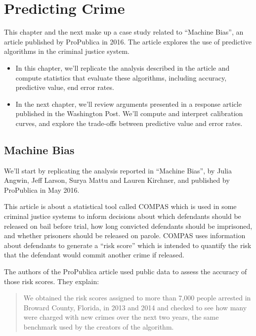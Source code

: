 \chapter{Predicting Crime}\label{predicting-crime}

This chapter and the next make up a case study related to ``Machine
Bias'', an article published by ProPublica in 2016. The article explores
the use of predictive algorithms in the criminal justice system.

\begin{itemize}
\item
  In this chapter, we'll replicate the analysis described in the article
  and compute statistics that evaluate these algorithms, including
  accuracy, predictive value, end error rates.
\item
  In the next chapter, we'll review arguments presented in a response
  article published in the Washington Post. We'll compute and interpret
  calibration curves, and explore the trade-offs between predictive
  value and error rates.
\end{itemize}

\section{Machine Bias}\label{machine-bias}

We'll start by replicating the analysis reported in ``Machine Bias'', by
Julia Angwin, Jeff Larson, Surya Mattu and Lauren Kirchner, and
published by ProPublica in May 2016.

This article is about a statistical tool called COMPAS which is used in
some criminal justice systems to inform decisions about which defendants
should be released on bail before trial, how long convicted defendants
should be imprisoned, and whether prisoners should be released on
parole. COMPAS uses information about defendants to generate a ``risk
score'' which is intended to quantify the risk that the defendant would
commit another crime if released.

The authors of the ProPublica article used public data to assess the
accuracy of those risk scores. They explain:

\begin{quote}
We obtained the risk scores assigned to more than 7,000 people arrested
in Broward County, Florida, in 2013 and 2014 and checked to see how many
were charged with new crimes over the next two years, the same benchmark
used by the creators of the algorithm.
\end{quote}


